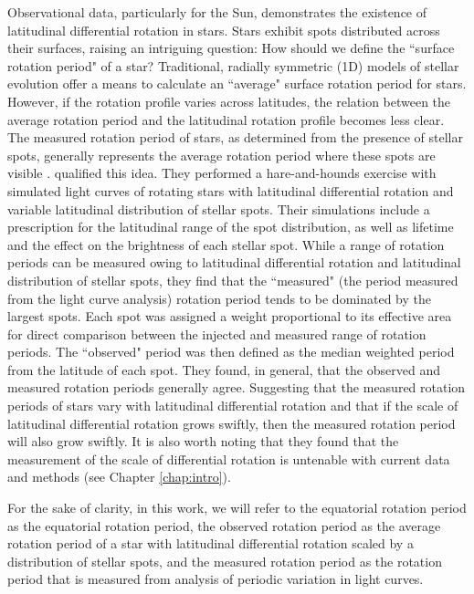 Observational data, particularly for the Sun, demonstrates the existence of latitudinal differential rotation in stars. 
Stars exhibit spots distributed across their surfaces, raising an intriguing question: How should we define the ``surface rotation period" of a star?
Traditional, radially symmetric (1D) models of stellar evolution offer a means to calculate an ``average" surface rotation period for stars. However, if the rotation profile varies across latitudes, the relation between the average rotation period and the latitudinal rotation profile becomes less clear.
The measured rotation period of stars, as determined from the presence of stellar spots, generally represents the average rotation period where these spots are visible \citep{santos_surface_2021}.
\citet{aigrain_hare_2015} qualified this idea.
They performed a hare-and-hounds exercise with simulated light curves of rotating stars with latitudinal differential rotation and variable latitudinal distribution of stellar spots.
Their simulations include a prescription for the latitudinal range of the spot distribution, as well as lifetime and the effect on the brightness of each stellar spot.
While a range of rotation periods can be measured owing to latitudinal differential rotation and latitudinal distribution of stellar spots, they find that the ``measured" (the period measured from the light curve analysis) rotation period tends to be dominated by the largest spots.
Each spot was assigned a weight proportional to its effective area for direct comparison between the injected and measured range of rotation periods.
The ``observed" period was then defined as the median weighted period from the latitude of each spot.
They found, in general, that the observed and measured rotation periods generally agree.
Suggesting that the measured rotation periods of stars vary with latitudinal differential rotation and that if the scale of latitudinal differential rotation grows swiftly, then the measured rotation period will also grow swiftly.
It is also worth noting that they found that the measurement of the scale of differential rotation is untenable with current data and methods (see Chapter \ref{chap:intro}).

For the sake of clarity, in this work, we will refer to the equatorial rotation period as the equatorial rotation period, the observed rotation period as the average rotation period of a star with latitudinal differential rotation scaled by a distribution of stellar spots, and the measured rotation period as the rotation period that is measured from analysis of periodic variation in light curves.

